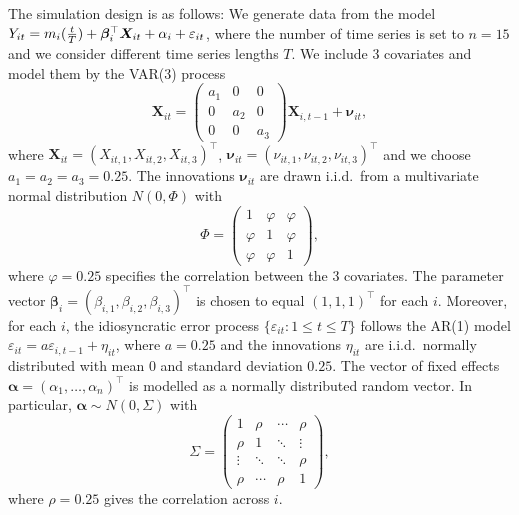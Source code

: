 \documentclass[12pt]{article}
\begin{document}
The simulation design is as follows: We generate data from the model $Y_{it} = m_i(\frac{t}{T}) + \bm{\beta}_i^\top \boldsymbol{X}_{it} +  \alpha_i  + \varepsilon_{it}$, where the number of time series is set to $n = 15$ and we consider different time series lengths $T$. We include $3$ covariates and model them by the VAR(3) process
\[ \boldsymbol{X}_{it} = \begin{pmatrix} a_1 & 0 & 0 \\ 0 & a_2 & 0 \\ 0 & 0 & a_3 \end{pmatrix} \boldsymbol{X}_{i,t-1} + \boldsymbol{\nu}_{it}, \] 
where $\boldsymbol{X}_{it} = ( X_{it,1}, X_{it,2}, X_{it,3} )^\top$, $\boldsymbol{\nu}_{it} = ( \nu_{it,1}, \nu_{it,2}, \nu_{it,3} )^\top$ and we choose $a_1 = a_2 = a_3 = 0.25$. The innovations $\boldsymbol{\nu}_{it}$ are drawn i.i.d.\ from a multivariate normal distribution $N(0,\Phi)$ with
\[ \Phi = \begin{pmatrix} 1 & \varphi & \varphi \\ \varphi & 1 & \varphi \\ \varphi & \varphi & 1 \end{pmatrix}, \]
where $\varphi = 0.25$ specifies the correlation between the 3 covariates.
The parameter vector $\boldsymbol{\beta}_i = (\beta_{i,1},\beta_{i,2},\beta_{i,3})^\top$ is chosen to equal $(1,1,1)^\top$ for each $i$. Moreover, for each $i$, the idiosyncratic error process $\{\varepsilon_{it}: 1 \le t \le T\}$ follows the AR(1) model $\varepsilon_{it} = a \varepsilon_{i, t-1} + \eta_{it}$, where $a = 0.25$ and the innovations $\eta_{it}$ are i.i.d.\ normally distributed with mean $0$ and standard deviation $0.25$. 
The vector of fixed effects $\boldsymbol{\alpha} = (\alpha_1,\ldots,\alpha_n)^\top$ is modelled as a normally distributed random vector. In particular, $\boldsymbol{\alpha} \sim N(0,\Sigma)$ with
\[ \Sigma =
\begin{pmatrix}
1      & \rho   & \cdots & \rho   \\
\rho   & 1      & \ddots & \vdots \\
\vdots & \ddots & \ddots & \rho   \\
\rho   & \cdots & \rho   & 1
\end{pmatrix},
\]
where $\rho = 0.25$ gives the correlation across $i$.
\end{document}
